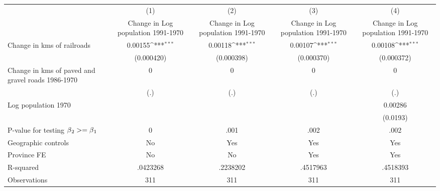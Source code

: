 {
\def\sym#1{\ifmmode^{#1}\else\(^{#1}\)\fi}
\begin{tabular}{l*{4}{c}}
\hline\hline
                &\multicolumn{1}{c}{(1)}&\multicolumn{1}{c}{(2)}&\multicolumn{1}{c}{(3)}&\multicolumn{1}{c}{(4)}\\
                &\multicolumn{1}{c}{Change in Log population 1991-1970}&\multicolumn{1}{c}{Change in Log population 1991-1970}&\multicolumn{1}{c}{Change in Log population 1991-1970}&\multicolumn{1}{c}{Change in Log population 1991-1970}\\
\hline
Change in kms of railroads&  0.00155\sym{***}&  0.00118\sym{***}&  0.00107\sym{***}&  0.00108\sym{***}\\
                &(0.000420)         &(0.000398)         &(0.000370)         &(0.000372)         \\
[1em]
Change in kms of paved and gravel roads 1986-1970&        0         &        0         &        0         &        0         \\
                &      (.)         &      (.)         &      (.)         &      (.)         \\
[1em]
Log population 1970&                  &                  &                  &  0.00286         \\
                &                  &                  &                  & (0.0193)         \\
\hline
P-value for testing $\beta\\_2 >= \beta\\_1$&        0         &     .001         &     .002         &     .002         \\
Geographic controls&       No         &      Yes         &      Yes         &      Yes         \\
Province FE     &       No         &       No         &      Yes         &      Yes         \\
R-squared       & .0423268         & .2238202         & .4517963         & .4518393         \\
Observations    &      311         &      311         &      311         &      311         \\
\hline\hline
\end{tabular}
}
